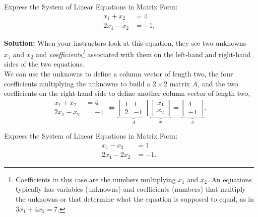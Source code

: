 \begin{example}
\label{ex:ExpressMatrixForm01}
Express the System of Linear Equations in Matrix Form: 
\begin{equation}
\label{eq:Axeqb01}
\begin{aligned}
x_1+x_2 &=4 \\
2x_1-x_2&=-1.
\end{aligned}
\end{equation}

\end{example}

\textbf{Solution:}
When your instructors look at this equation, they see two unknowns $x_1$ and $x_2$ and \textit{coefficients\footnote{Coefficients in this case are the numbers multiplying $x_1$ and $x_2.$ An equations typically has variables (unknowns) and coefficients (numbers) that multiply the unknowns or that determine what the equation is supposed to equal, as in $3x_1 + 4 x_2 =7$.}} associated with them on the left-hand and right-hand sides of the two equations.\\

We can use the unknowns to define a column vector of length two, the four coefficients multiplying the unknowns to build a $2 \times 2$ matrix $A$, and the two coefficients on the right-hand side to define another column vector of length two, 
 \begin{equation}
\label{eq:Axeqb02}
\begin{aligned}
x_1+x_2 &=4 \\
2x_1-x_2&=-1
\end{aligned} \iff \underbrace{\left[\begin{array}{rr} 1 & 1\\
2 & -1 \end{array}\right]}_{A} \underbrace{\left[\begin{array}{c} x_1\\
x_2\end{array}\right]}_{x} =   \underbrace{\left[\begin{array}{r} 4\\
-1\end{array}\right]}_{b}.
\end{equation}
\Qed

\begin{example}
\label{ex:ExpressMatrixForm02}
Express the System of Linear Equations in Matrix Form: 
\begin{equation}
\begin{aligned}
x_1-x_2 &=1 \\
2x_1-2x_2&=-1.
\end{aligned}
\end{equation}

\end{example}

